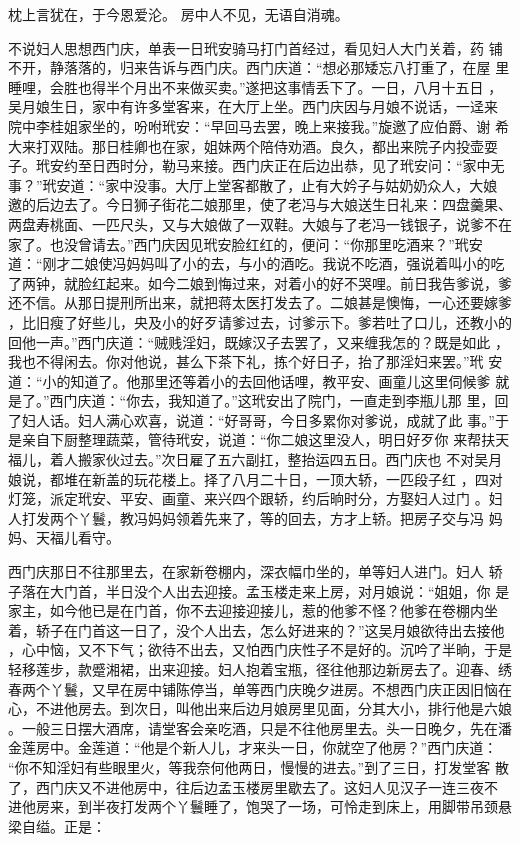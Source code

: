 枕上言犹在，于今恩爱沦。
房中人不见，无语自消魂。

不说妇人思想西门庆，单表一日玳安骑马打门首经过，看见妇人大门关着，药
铺不开，静落落的，归来告诉与西门庆。西门庆道：“想必那矮忘八打重了，在屋
里睡哩，会胜也得半个月出不来做买卖。”遂把这事情丢下了。一日，八月十五日
，吴月娘生日，家中有许多堂客来，在大厅上坐。西门庆因与月娘不说话，一迳来
院中李桂姐家坐的，吩咐玳安：“早回马去罢，晚上来接我。”旋邀了应伯爵、谢
希大来打双陆。那日桂卿也在家，姐妹两个陪侍劝酒。良久，都出来院子内投壶耍
子。玳安约至日西时分，勒马来接。西门庆正在后边出恭，见了玳安问：“家中无
事？”玳安道：“家中没事。大厅上堂客都散了，止有大妗子与姑奶奶众人，大娘
邀的后边去了。今日狮子街花二娘那里，使了老冯与大娘送生日礼来：四盘羹果、
两盘寿桃面、一匹尺头，又与大娘做了一双鞋。大娘与了老冯一钱银子，说爹不在
家了。也没曾请去。”西门庆因见玳安脸红红的，便问：“你那里吃酒来？”玳安
道：“刚才二娘使冯妈妈叫了小的去，与小的酒吃。我说不吃酒，强说着叫小的吃
了两钟，就脸红起来。如今二娘到悔过来，对着小的好不哭哩。前日我告爹说，爹
还不信。从那日提刑所出来，就把蒋太医打发去了。二娘甚是懊悔，一心还要嫁爹
，比旧瘦了好些儿，央及小的好歹请爹过去，讨爹示下。爹若吐了口儿，还教小的
回他一声。”西门庆道：“贼贱淫妇，既嫁汉子去罢了，又来缠我怎的？既是如此
，我也不得闲去。你对他说，甚么下茶下礼，拣个好日子，抬了那淫妇来罢。”玳
安道：“小的知道了。他那里还等着小的去回他话哩，教平安、画童儿这里伺候爹
就是了。”西门庆道：“你去，我知道了。”这玳安出了院门，一直走到李瓶儿那
里，回了妇人话。妇人满心欢喜，说道：“好哥哥，今日多累你对爹说，成就了此
事。”于是亲自下厨整理蔬菜，管待玳安，说道：“你二娘这里没人，明日好歹你
来帮扶天福儿，着人搬家伙过去。”次日雇了五六副扛，整抬运四五日。西门庆也
不对吴月娘说，都堆在新盖的玩花楼上。择了八月二十日，一顶大轿，一匹段子红
，四对灯笼，派定玳安、平安、画童、来兴四个跟轿，约后晌时分，方娶妇人过门
。妇人打发两个丫鬟，教冯妈妈领着先来了，等的回去，方才上轿。把房子交与冯
妈妈、天福儿看守。

西门庆那日不往那里去，在家新卷棚内，深衣幅巾坐的，单等妇人进门。妇人
轿子落在大门首，半日没个人出去迎接。孟玉楼走来上房，对月娘说：“姐姐，你
是家主，如今他已是在门首，你不去迎接迎接儿，惹的他爹不怪？他爹在卷棚内坐
着，轿子在门首这一日了，没个人出去，怎么好进来的？”这吴月娘欲待出去接他
，心中恼，又不下气；欲待不出去，又怕西门庆性子不是好的。沉吟了半晌，于是
轻移莲步，款蹙湘裙，出来迎接。妇人抱着宝瓶，径往他那边新房去了。迎春、绣
春两个丫鬟，又早在房中铺陈停当，单等西门庆晚夕进房。不想西门庆正因旧恼在
心，不进他房去。到次日，叫他出来后边月娘房里见面，分其大小，排行他是六娘
。一般三日摆大酒席，请堂客会亲吃酒，只是不往他房里去。头一日晚夕，先在潘
金莲房中。金莲道：“他是个新人儿，才来头一日，你就空了他房？”西门庆道：
“你不知淫妇有些眼里火，等我奈何他两日，慢慢的进去。”到了三日，打发堂客
散了，西门庆又不进他房中，往后边孟玉楼房里歇去了。这妇人见汉子一连三夜不
进他房来，到半夜打发两个丫鬟睡了，饱哭了一场，可怜走到床上，用脚带吊颈悬
梁自缢。正是：

